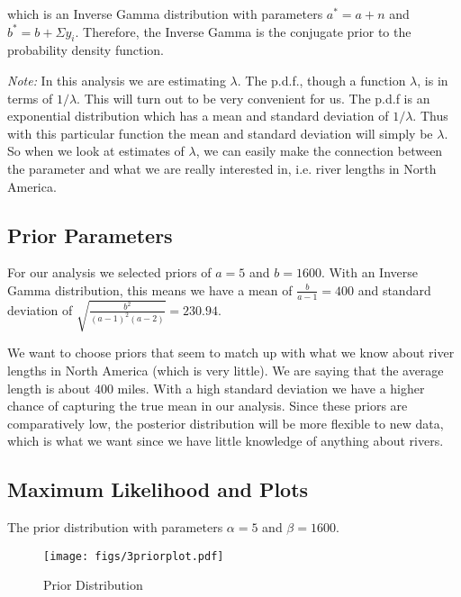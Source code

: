 \documentclass[12pt]{article}
\begin{document}
\noindent which is an Inverse Gamma distribution with parameters $a^*=a+n$ and $b^*=b+\Sigma y_i$.  Therefore, the Inverse Gamma is the conjugate prior to the probability density function.
\bigskip

\begin{scriptsize}
\noindent \textit{Note:} In this analysis we are estimating $\lambda$.  The p.d.f., though a function $\lambda$, is in terms of $1/\lambda$.  This will turn out to be very convenient for us.  The p.d.f is an exponential distribution which has a mean and standard deviation of $1/\lambda$.  Thus with this particular function the mean and standard deviation will simply be $\lambda$.  So when we look at estimates of $\lambda$, we can easily make the connection between the parameter and what we are really interested in, i.e. river lengths in North America.
\end{scriptsize}

\subsection{Prior Parameters}

\noindent For our analysis we selected priors of $a=5$ and $b=1600$.  With an Inverse Gamma distribution, this means we have a mean of $\frac{b}{a-1}=400$ and standard deviation of $\sqrt{\frac{b^2}{(a-1)^2(a-2)}}=230.94$.
\bigskip

\noindent We want to choose priors that seem to match up with what we know about river lengths in North America (which is very little).  We are saying that the average length is about $400$ miles.  With a high standard deviation we have a higher chance of capturing the true mean in our analysis.  Since these priors are comparatively low, the posterior distribution will be more flexible to new data, which is what we want since we have little knowledge of anything about rivers.

\subsection{Maximum Likelihood and Plots}

The prior distribution with parameters $\alpha=5$ and $\beta=1600$.

\begin{figure}[H]
\begin{center}
\texttt{[image: figs/3priorplot.pdf]}
\caption{Prior Distribution}
\end{center}
\end{figure}
\end{document}
